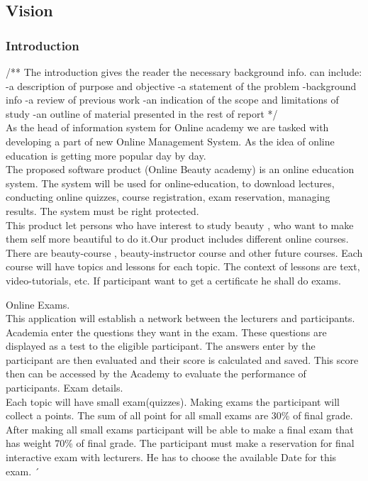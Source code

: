 \documentclass{scrartcl}
\begin{document}
\lipsum[1-8]
\subsection{Vision}

  	\subsubsection{Introduction}
  	/** The introduction gives the reader the necessary background info. can include:
-a description of purpose and objective
-a statement of the problem
-background info
-a review of previous work
-an indication of the scope and limitations of study
-an outline of material presented in the rest of report
*/ \\
As the head of information system for Online academy we are tasked with developing a part of new Online Management System. As the idea of online education is getting more popular day by day. \\
The proposed software product (Online Beauty academy) is an online education system. The system will be used for online-education, to download lectures, conducting online quizzes, course registration, exam reservation, managing results. The system must be right protected.\\
This product let persons who have interest to study beauty , who want to make them self more beautiful to do it.Our product includes different online courses. There are  beauty-course , beauty-instructor course and other future courses.
 Each course will have topics and lessons for each topic. The context of lessons are text, video-tutorials, etc. 
 If participant want to get a certificate he shall do exams. 

Online Exams.\\
 This application will establish a network between the lecturers and participants. Academia enter the questions they want in the exam. These questions are displayed as a test to the eligible participant. The answers enter by the participant are then evaluated and their score is calculated and saved. This score then can be accessed by the Academy to evaluate the performance of participants.
Exam details.\\
Each topic will have small exam(quizzes). Making exams the participant will collect a points. The sum of all point for all small exams are 30\% of final grade. After making all small exams participant will be able to make a final exam that has weight 70\% of final grade. The participant must make a reservation for final interactive exam with lecturers. He has to choose the available Date for this exam. ´\\
\end{document}
